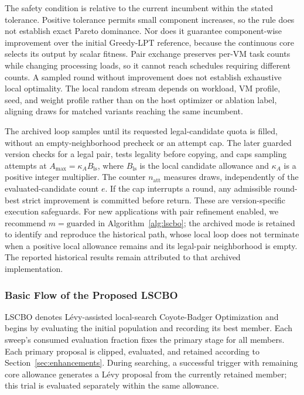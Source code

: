 \documentclass[pdflatex,onecolumn,sn-mathphys-num]{sn-jnl}
\begin{document}
The safety condition is relative to the current incumbent within the stated tolerance. Positive tolerance permits small component increases, so the rule does not establish exact Pareto dominance. Nor does it guarantee component-wise improvement over the initial Greedy-LPT reference, because the continuous core selects its output by scalar fitness. Pair exchange preserves per-VM task counts while changing processing loads, so it cannot reach schedules requiring different counts. A sampled round without improvement does not establish exhaustive local optimality. The local random stream depends on workload, VM profile, seed, and weight profile rather than on the host optimizer or ablation label, aligning draws for matched variants reaching the same incumbent.

The archived loop samples until its requested legal-candidate quota is filled, without an empty-neighborhood precheck or an attempt cap. The later guarded version checks for a legal pair, tests legality before copying, and caps sampling attempts at $A_{\max}=\kappa_A B_{\mathrm{ls}}$, where $B_{\mathrm{ls}}$ is the local candidate allowance and $\kappa_A$ is a positive integer multiplier. The counter $n_{\mathrm{att}}$ measures draws, independently of the evaluated-candidate count $e$. If the cap interrupts a round, any admissible round-best strict improvement is committed before return. These are version-specific execution safeguards. For new applications with pair refinement enabled, we recommend $m=\text{guarded}$ in Algorithm~\ref{alg:lscbo}; the archived mode is retained to identify and reproduce the historical path, whose local loop does not terminate when a positive local allowance remains and its legal-pair neighborhood is empty. The reported historical results remain attributed to that archived implementation.

\subsubsection{Basic Flow of the Proposed LSCBO}\label{sec:lscbo_framework}
LSCBO denotes L\'{e}vy-assisted local-search Coyote-Badger Optimization and begins by evaluating the initial population and recording its best member. Each sweep's consumed evaluation fraction fixes the primary stage for all members. Each primary proposal is clipped, evaluated, and retained according to Section~\ref{sec:enhancements}. During searching, a successful trigger with remaining core allowance generates a L\'{e}vy proposal from the currently retained member; this trial is evaluated separately within the same allowance.
\end{document}
